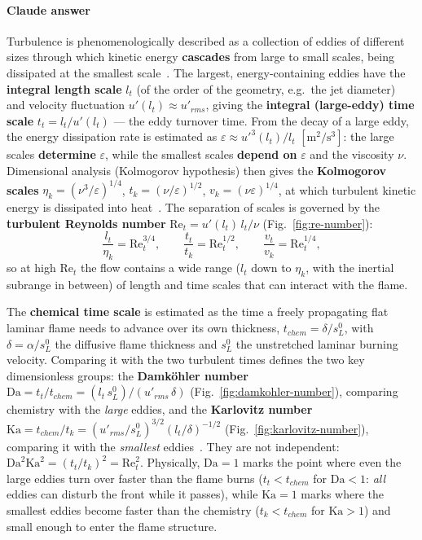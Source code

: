 {\color{istblue}
\paragraph{Claude answer}
Turbulence is phenomenologically described as a collection of eddies of different sizes through which kinetic energy \textbf{cascades} from large to small scales, being dissipated at the smallest scale~\cite{lecture8,pope2000turbulent}. The largest, energy-containing eddies have the \textbf{integral length scale} $l_t$ (of the order of the geometry, e.g.\ the jet diameter) and velocity fluctuation $u'(l_t) \approx u'_{rms}$, giving the \textbf{integral (large-eddy) time scale} $t_t = l_t / u'(l_t)$ --- the eddy turnover time. From the decay of a large eddy, the energy dissipation rate is estimated as $\varepsilon \approx u'^3(l_t)/l_t$ $[\mathrm{m^2/s^3}]$: the large scales \textbf{determine} $\varepsilon$, while the smallest scales \textbf{depend on} $\varepsilon$ and the viscosity $\nu$. Dimensional analysis (Kolmogorov hypothesis) then gives the \textbf{Kolmogorov scales} $\eta_k = (\nu^3/\varepsilon)^{1/4}$, $t_k = (\nu/\varepsilon)^{1/2}$, $v_k = (\nu \varepsilon)^{1/4}$, at which turbulent kinetic energy is dissipated into heat~\cite{pope2000turbulent}. The separation of scales is governed by the \textbf{turbulent Reynolds number} $\mathrm{Re}_t = u'(l_t)\, l_t / \nu$ (Fig.~\ref{fig:re-number}):
\begin{equation*}
\frac{l_t}{\eta_k} = \mathrm{Re}_t^{3/4}, \qquad \frac{t_t}{t_k} = \mathrm{Re}_t^{1/2}, \qquad \frac{v_t}{v_k} = \mathrm{Re}_t^{1/4},
\end{equation*}
so at high $\mathrm{Re}_t$ the flow contains a wide range ($l_t$ down to $\eta_k$, with the inertial subrange in between) of length and time scales that can interact with the flame.

The \textbf{chemical time scale} is estimated as the time a freely propagating flat laminar flame needs to advance over its own thickness, $t_{chem} = \delta / s_L^0$, with $\delta = \alpha / s_L^0$ the diffusive flame thickness and $s_L^0$ the unstretched laminar burning velocity. Comparing it with the two turbulent times defines the two key dimensionless groups: the \textbf{Damk\"ohler number} $\mathrm{Da} = t_t / t_{chem} = (l_t\, s_L^0)/(u'_{rms}\, \delta)$ (Fig.~\ref{fig:damkohler-number}), comparing chemistry with the \textit{large} eddies, and the \textbf{Karlovitz number} $\mathrm{Ka} = t_{chem}/t_k = (u'_{rms}/s_L^0)^{3/2} (l_t/\delta)^{-1/2}$ (Fig.~\ref{fig:karlovitz-number}), comparing it with the \textit{smallest} eddies~\cite{lecture8,peters2000turbulent}. They are not independent: $\mathrm{Da}^2 \mathrm{Ka}^2 = (t_t/t_k)^2 = \mathrm{Re}_t^2$. Physically, $\mathrm{Da} = 1$ marks the point where even the large eddies turn over faster than the flame burns ($t_t < t_{chem}$ for $\mathrm{Da}<1$: \textit{all} eddies can disturb the front while it passes), while $\mathrm{Ka} = 1$ marks where the smallest eddies become faster than the chemistry ($t_k < t_{chem}$ for $\mathrm{Ka}>1$) and small enough to enter the flame structure.

}
